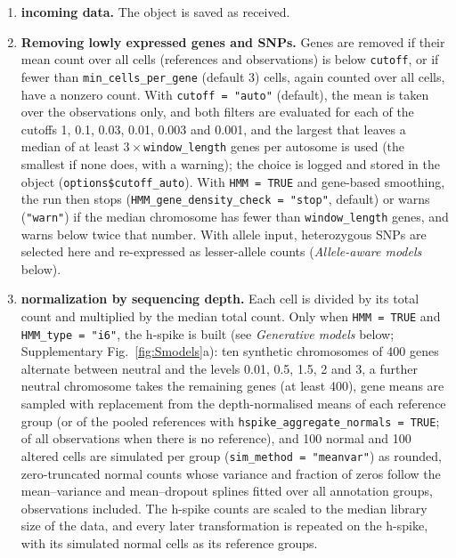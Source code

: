 \begin{enumerate}
\tightlist
\item[\textbf{1}] \textbf{incoming data.} The object is saved as received.

\item[\textbf{2}] \textbf{Removing lowly expressed genes and SNPs.} Genes are removed if their mean count over all cells (references and observations) is below \texttt{cutoff}, or if fewer than \texttt{min\_cells\_per\_gene} (default 3) cells, again counted over all cells, have a nonzero count. With \texttt{cutoff\ =\ "auto"} (default), the mean is taken over the observations only, and both filters are evaluated for each of the cutoffs 1, 0.1, 0.03, 0.01, 0.003 and 0.001, and the largest that leaves a median of at least $3\times$\texttt{window\_length} genes per autosome is used (the smallest if none does, with a warning); the choice is logged and stored in the object (\texttt{options\$cutoff\_auto}). With \texttt{HMM\ =\ TRUE} and gene-based smoothing, the run then stops (\texttt{HMM\_gene\_density\_check\ =\ "stop"}, default) or warns (\texttt{"warn"}) if the median chromosome has fewer than \texttt{window\_length} genes, and warns below twice that number. With allele input, heterozygous SNPs are selected here and re-expressed as lesser-allele counts (\emph{Allele-aware models} below).

\item[\textbf{3}] \textbf{normalization by sequencing depth.} Each cell is divided by its total count and multiplied by the median total count. Only when \texttt{HMM\ =\ TRUE} and \texttt{HMM\_type\ =\ "i6"}, the h-spike is built (see \emph{Generative models} below; Supplementary Fig.~\ref{fig:Smodels}a): ten synthetic chromosomes of 400 genes alternate between neutral and the levels 0.01, 0.5, 1.5, 2 and 3, a further neutral chromosome takes the remaining genes (at least 400), gene means are sampled with replacement from the depth-normalised means of each reference group (or of the pooled references with \texttt{hspike\_aggregate\_normals\ =\ TRUE}; of all observations when there is no reference), and 100 normal and 100 altered cells are simulated per group (\texttt{sim\_method\ =\ "meanvar"}) as rounded, zero-truncated normal counts whose variance and fraction of zeros follow the mean--variance and mean--dropout splines fitted over all annotation groups, observations included. The h-spike counts are scaled to the median library size of the data, and every later transformation is repeated on the h-spike, with its simulated normal cells as its reference groups.


\end{enumerate}
